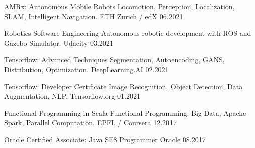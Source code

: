 

\begin{cvhonors}

  \cvhonor
    {AMRx: Autonomous Mobile Robots} %
    {Locomotion, Perception, Localization, SLAM, Intelligent Navigation.} %
    {ETH Zurich / edX} %
    {06.2021} %

    \cvhonor
    {Robotics Software Engineering} %
    {Autonomous robotic development with ROS and Gazebo Simulator.} %
    {Udacity} %
    {03.2021} %

    \cvhonor
    {Tensorflow: Advanced Techniques} %
    {Segmentation, Autoencoding, GANS, Distribution, Optimization.} %
    {DeepLearning.AI} %
    {02.2021} %

    \cvhonor
    {Tensorflow: Developer Certificate} %
    {Image Recognition, Object Detection, Data Augmentation, NLP.} %
    {Tensorflow.org} %
    {01.2021} %

    \cvhonor
    {Functional Programming in Scala} %
    {Functional Programming, Big Data, Apache Spark, Parallel Computation.} %
    {EPFL / Coursera} %
    {12.2017} %

    \cvhonor
    {Oracle Certified Associate: Java SE8 Programmer} %
    {} %
    {Oracle} %
    {08.2017} %

\end{cvhonors}
